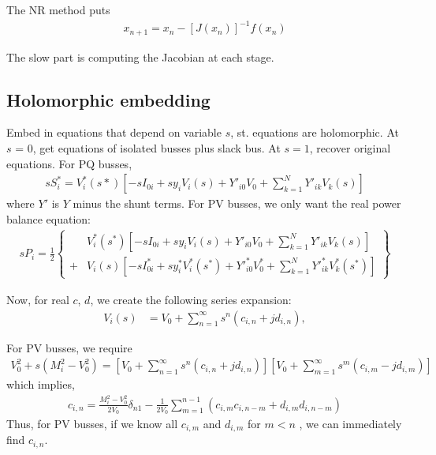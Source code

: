 \documentclass[11pt]{article}
\begin{document}
The NR method puts
\begin{align}
x_{n+1} = x_n - [J(x_n)]^{-1}f(x_n)
\end{align}

The slow part is computing the Jacobian at each stage.

\subsection{Holomorphic embedding}
Embed in equations that depend on variable $s$, st. equations are holomorphic. At $s$ = 0, get equations of isolated busses plus slack bus. At $s = 1$, recover original equations.
For PQ busses,
\begin{align}
	sS^*_i = V^*_i(s*)\left[
		-sI_{0i} + sy_iV_i(s) + Y'_{i0}V_0 + \sum_{k=1}^N{Y'_{ik}V_k(s)}
	\right]
	\label{EQ_POWER_BAL}
\end{align}
where $Y'$ is $Y$ minus the shunt terms. 
For PV busses, we only want the real power balance equation:
\begin{align}
	sP_i = \frac{1}{2}\left\{
		\begin{aligned}
			&V^*_i(s^*)\left[
				-sI_{0i} + sy_iV_i(s) + Y'_{i0}V_0 + \sum_{k=1}^N{Y'_{ik}V_k(s)}
			\right] \\
			+ &V_i(s)\left[
				-sI^*_{0i} + sy^*_iV^*_i(s^*) + Y'^*_{i0}V^*_0 + \sum_{k=1}^N{Y'^*_{ik}V^*_k(s^*)}
			\right]
		\end{aligned}
	\right\}
	\label{EQ_POWER_BAL}
\end{align}

Now, for real $c$, $d$, we create the following series expansion:
\begin{align}
	V_i(s) &= V_0 + \sum_{n=1}^{\infty}{s^n (c_{i,n} + j d_{i,n})},
\end{align}

For PV busses, we require
\begin{align}
	V_0^2 + s(M_i^2 - V_0^2) = \left[V_0 + \sum_{n=1}^{\infty}{s^n (c_{i,n} + j d_{i,n})}\right]\left[V_0 + \sum_{m=1}^{\infty}{s^m (c_{i,m} - j d_{i,m})}\right] 
\end{align}
which implies,
\begin{align}
	c_{i,n} =  \frac{M_i^2 - V_0^2}{2V_0}\delta_{n1} - \frac{1}{2V_0}\sum_{m=1}^{n-1}\left(c_{i,m}c_{i,n-m}+d_{i,m}d_{i,n-m}\right)
	\label{EQ_B}
\end{align}
Thus, for PV busses, if we know all $c_{i,m}$ and $d_{i,m}$ for $m < n$ , we can immediately find $c_{i, n}$.
\end{document}
